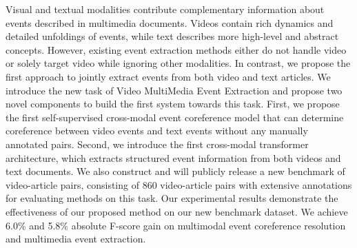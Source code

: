 Visual and textual modalities contribute complementary information about events described in multimedia documents. Videos contain rich dynamics and detailed unfoldings of events, while text describes more high-level and abstract concepts. However, existing event extraction methods either do not handle video or solely target video while ignoring other modalities. In contrast, we propose the first approach to jointly extract events from both video and text articles. We introduce the new task of Video MultiMedia Event Extraction and propose two novel components to build the first system towards this task. First, we propose the first self-supervised cross-modal event coreference model that can determine coreference between video events and text events without any manually annotated pairs. Second, we introduce the first cross-modal transformer architecture, which extracts structured event information from both videos and text documents. We also construct and will publicly release a new benchmark of video-article pairs, consisting of 860 video-article pairs with extensive annotations for evaluating methods on this task. Our experimental results demonstrate the effectiveness of our proposed method on our new benchmark dataset. We achieve 6.0\% and 5.8\% absolute F-score gain on multimodal event coreference resolution and multimedia event extraction.
